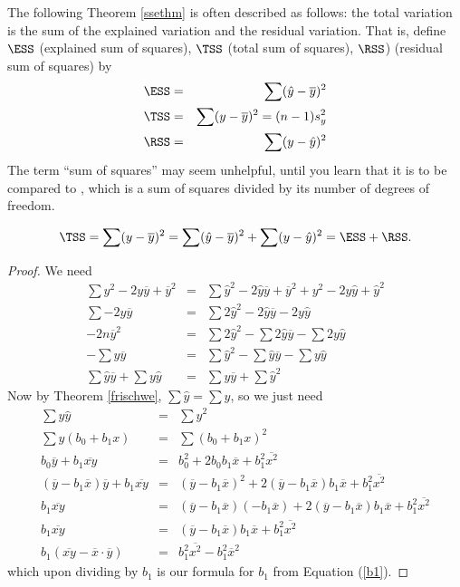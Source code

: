  The following Theorem \ref{ssethm} is often described as follows: the total variation is the sum of the explained variation and the residual variation.
 That is, define $\ESS$ (explained sum of squares), $\TSS$ (total sum of squares), $\RSS$) (residual sum of squares) by
 \begin{eqnarray*}
 	\ESS &=& \sum (\hat y-\overline y)^2\\
	\TSS &=& \sum(y-\overline y)^2 = (n-1)s_y^2\\
	\RSS &=& \sum(y-\hat y)^2
 \end{eqnarray*}
 The term ``sum of squares'' may seem unhelpful, until you learn that it is to be compared to , which is a sum of squares divided by its number of degrees of freedom.
 \begin{thm}\label{ssethm}
	\[
		\label{SSE}
		\TSS = \sum(y-\overline y)^2 = \sum (\hat y-\overline y)^2 + \sum(y-\hat y)^2 = \ESS + \RSS.
	\]
\end{thm}
\begin{proof}
	We need
	\begin{eqnarray*}
		\sum y^2 - 2y\overline y + \overline y^2 &=& \sum \hat y^2-2\hat y\overline y + \overline y^2 + y^2 - 2y\hat y + \hat y^2\\
		\sum  - 2y\overline y  &=& \sum 2\hat y^2-2\hat y\overline y   - 2y\hat y \\
		-2n\overline y^2  &=& \sum 2\hat y^2- \sum 2\hat y\overline y   - \sum 2y\hat y \\
		-\sum y\overline y  &=& \sum \hat y^2- \sum \hat y\overline y   - \sum y\hat y \\
		 \sum \hat y\overline y   + \sum y\hat y &=& \sum y\overline y   +  \sum \hat y^2
	\end{eqnarray*}
	Now by Theorem \ref{frischwe}, $\sum\hat y = \sum y$, so we just need
	\begin{eqnarray*}
		  \sum y\hat y &=&   \sum \hat y^2\\
		  \sum y(b_0+b_1x) &=&   \sum (b_0+b_1x)^2\\
		  b_0\overline y + b_1 \overline {xy} &=& b_0^2 + 2b_0b_1\overline x + b_1^2\overline{x^2}\\
		  (\overline y-b_1\overline x)\overline y + b_1 \overline {xy} &=& (\overline y-b_1\overline x)^2 + 2(\overline y-b_1\overline x)b_1\overline x +b_1^2 \overline{x^2}\\
		  b_1 \overline {xy} &=& (\overline y-b_1\overline x)(-b_1\overline x) + 2(\overline y-b_1\overline x)b_1\overline x + b_1^2\overline{x^2}\\
		  b_1 \overline {xy} &=& (\overline y-b_1\overline x)b_1\overline x +b_1^2 \overline{x^2}\\
		b_1(\overline{xy} - \overline x\cdot\overline y) &=& b_1^2\overline{x^2} - b_1^2\overline{x}^2
	\end{eqnarray*}
	which upon dividing by $b_1$ is our formula for $b_1$ from Equation (\ref{b1}).
\end{proof}

